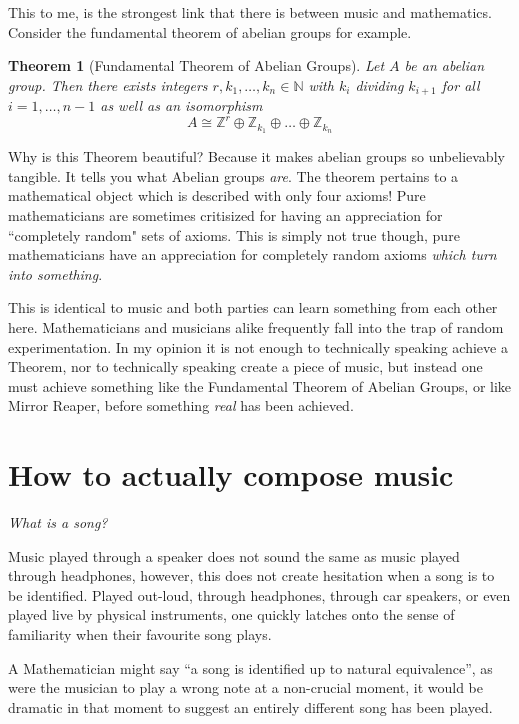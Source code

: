 \documentclass[12pt]{book}
\theoremstyle{plain}
\newtheorem{thm}{Theorem}[subsection] %
\theoremstyle{definition}
\newcommand{\bb}[1]{\mathbb{#1}}
\begin{document}
This to me, is the strongest link that there is between music and mathematics. Consider the fundamental theorem of abelian groups for example.

\begin{thm}[Fundamental Theorem of Abelian Groups]
	Let $A$ be an abelian group. Then there exists integers $r, k_1, \ldots, k_n \in \bb{N}$ with $k_i$ dividing $k_{i+1}$ for all $i = 1, \ldots, n-1$ as well as an isomorphism
	\begin{equation}
		A \cong \bb{Z}^r \oplus \bb{Z}_{k_1} \oplus \ldots \oplus \bb{Z}_{k_n}
		\end{equation}
	\end{thm}

Why is this Theorem beautiful? Because it makes abelian groups so unbelievably tangible. It tells you what Abelian groups \emph{are}. The theorem pertains to a mathematical object which is described with only four axioms! Pure mathematicians are sometimes critisized for having an appreciation for ``completely random" sets of axioms. This is simply not true though, pure mathematicians have an appreciation for completely random axioms \emph{which turn into something}.

This is identical to music and both parties can learn something from each other here. Mathematicians and musicians alike frequently fall into the trap of random experimentation. In my opinion it is not enough to technically speaking achieve a Theorem, nor to technically speaking create a piece of music, but instead one must achieve something like the Fundamental Theorem of Abelian Groups, or like Mirror Reaper, before something \emph{real} has been achieved.

\section{How to actually compose music}
\begin{center}
	\emph{What is a song?}
	\end{center}
Music played through a speaker does not sound the same as music played through headphones, however, this does not create hesitation when a song is to be identified. Played out-loud, through headphones, through car speakers, or even played live by physical instruments, one quickly latches onto the sense of familiarity when their favourite song plays.

A Mathematician might say “a song is identified up to natural equivalence”, as were the musician to play a wrong note at a non-crucial moment, it would be dramatic in that moment to suggest an entirely different song has been played.
\end{document}
